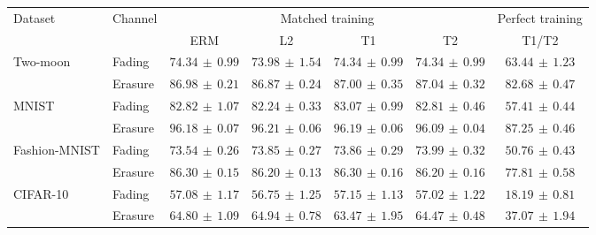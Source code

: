 \begin{tabular*}{\linewidth}{@{\extracolsep{\fill}}llccccc@{}}
\toprule
\multirow{2}{*}{Dataset} & \multirow{2}{*}{Channel} & \multicolumn{4}{c}{Matched training} & Perfect training \\
\cmidrule(lr){3-6}\cmidrule(l){7-7}
 & & ERM & L2 & T1 & T2 & T1/T2 \\
\midrule
\multirow{2}{*}{Two-moon} & Fading & $\mathbf{74.34}\,\pm\,0.99$ & $73.98\,\pm\,1.54$ & $74.34\,\pm\,0.99$ & $74.34\,\pm\,0.99$ & $63.44\,\pm\,1.23$ \\
 & Erasure & $86.98\,\pm\,0.21$ & $86.87\,\pm\,0.24$ & $87.00\,\pm\,0.35$ & $\mathbf{87.04}\,\pm\,0.32$ & $82.68\,\pm\,0.47$ \\
\midrule[0.25pt]
\multirow{2}{*}{MNIST} & Fading & $82.82\,\pm\,1.07$ & $82.24\,\pm\,0.33$ & $\mathbf{83.07}\,\pm\,0.99$ & $82.81\,\pm\,0.46$ & $57.41\,\pm\,0.44$ \\
 & Erasure & $96.18\,\pm\,0.07$ & $\mathbf{96.21}\,\pm\,0.06$ & $96.19\,\pm\,0.06$ & $96.09\,\pm\,0.04$ & $87.25\,\pm\,0.46$ \\
\midrule[0.25pt]
\multirow{2}{*}{Fashion-MNIST} & Fading & $73.54\,\pm\,0.26$ & $73.85\,\pm\,0.27$ & $73.86\,\pm\,0.29$ & $\mathbf{73.99}\,\pm\,0.32$ & $50.76\,\pm\,0.43$ \\
 & Erasure & $\mathbf{86.30}\,\pm\,0.15$ & $86.20\,\pm\,0.13$ & $86.30\,\pm\,0.16$ & $86.20\,\pm\,0.16$ & $77.81\,\pm\,0.58$ \\
\midrule[0.25pt]
\multirow{2}{*}{CIFAR-10} & Fading & $57.08\,\pm\,1.17$ & $56.75\,\pm\,1.25$ & $\mathbf{57.15}\,\pm\,1.13$ & $57.02\,\pm\,1.22$ & $18.19\,\pm\,0.81$ \\
 & Erasure & $64.80\,\pm\,1.09$ & $\mathbf{64.94}\,\pm\,0.78$ & $63.47\,\pm\,1.95$ & $64.47\,\pm\,0.48$ & $37.07\,\pm\,1.94$ \\
\bottomrule
\end{tabular*}
